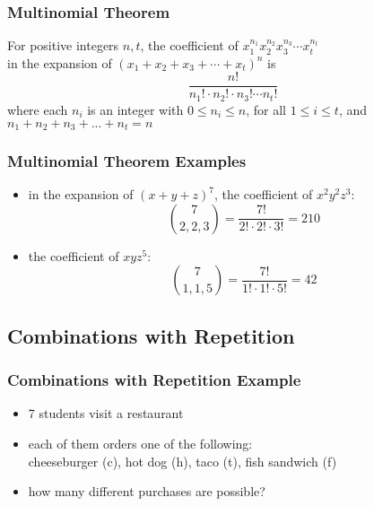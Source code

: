 \documentclass[dvipsnames]{beamer}
\begin{document}
\begin{frame}
  \frametitle{Multinomial Theorem}

  \begin{theorem}
    For positive integers $n, t$, the coefficient of
    $x_{1}^{n_1} x_{2}^{n_2} x_{3}^{n_3} \cdots x_{t}^{n_t}$\\
    in the expansion of $(x_1 + x_2 + x_3 + \cdots + x_t)^n$ is
    \begin{equation*}
      \frac{n!}{n_1! \cdot n_2! \cdot n_3! \cdots n_t!}
    \end{equation*}
    where each $n_i$ is an integer with $0 \leq n_i \leq n$,
    for all $1 \leq i \leq t$, and\\
    $n_1 + n_2 + n_3 + ... + n_t = n$
  \end{theorem}
\end{frame}

\begin{frame}
  \frametitle{Multinomial Theorem Examples}

  \begin{example}
    \begin{itemize}
      \item in the expansion of $(x+y+z)^7$, the coefficient of $x^2 y^2 z^3$:
      \begin{equation*}
        {7 \choose 2,2,3} = \frac{7!}{2! \cdot 2! \cdot 3!} = 210
      \end{equation*}
    \end{itemize}
    \begin{itemize}
      \item the coefficient of $x y z^5$:
      \begin{equation*}
        {7 \choose 1,1,5} = \frac{7!}{1! \cdot 1! \cdot 5!} = 42
      \end{equation*}
    \end{itemize}
  \end{example}
\end{frame}

\subsection{Combinations with Repetition}

\begin{frame}
  \frametitle{Combinations with Repetition Example}

  \begin{example}
    \begin{itemize}
      \item 7 students visit a restaurant
      \item each of them orders one of the following:\\
        cheeseburger (c), hot dog (h), taco (t), fish sandwich (f)
      \item how many different purchases are possible?
    \end{itemize}
  \end{example}
\end{frame}
\end{document}
